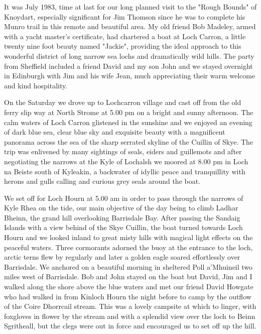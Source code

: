 \documentclass[a5paper,openany,font 10pt]{scrbook}
\begin{document}
It was July 1983, time at last for our long planned visit to
the "Rough Bounds" of Knoydart, especially significant for Jim
Thomson since he was to complete his Munro trail in this remote
and beautiful area. My old friend Bob Madeley, armed with a
yacht master's certificate, had chartered a boat at Loch Carron,
a little twenty nine foot beauty named "Jackie", providing the
ideal approach to this wonderful district of long narrow sea
lochs and dramatically wild hills. The party from Sheffield
included a friend David and my son John and we stayed overnight
in Edinburgh with Jim and his wife Jean, much appreciating their
warm welcome and kind hospitality.

On the Saturday we drove up to Lochcarron village and cast
off from the old ferry slip way at North Strome at 5.00 pm on a
bright and sunny afternoon. The calm waters of Loch Carron
glistened in the sunshine and we enjoyed an evening of dark blue
sea, clear blue sky and exquisite beauty with a magnificent
panorama across the sea of the sharp serrated skyline of the
Cuillin of Skye. The trip was enlivened by many sightings of
seals, eiders and guillemots and after negotiating the narrows at
the Kyle of Lochalsh we moored at 8.00 pm in Loch na Beiste south
of Kyleakin, a backwater of idyllic peace and tranquillity with
herons and gulls calling and curious grey seals around the boat.

We set off for Loch Hourn at 5.00 am in order to pass
through the narrows of Kyle Rhea on the tide, our main objective
of the day being to climb Ladhar Bheinn, the grand hill
overlooking Barrisdale Bay. After passing the Sandaig Islands
with a view behind of the Skye Cuillin, the boat turned towards
Loch Hourn and we looked inland to great misty hills with magical
light effects on the peaceful waters. Three cormorants adorned
the buoy at the entrance to the loch, arctic terns flew by
regularly and later a golden eagle soared effortlessly over
Barrisdale. We anchored on a beautiful morning in sheltered Poll
a'Mhuineil two miles west of Barrisdale. Bob and John stayed on
the boat but David, Jim and I walked along the shore above the
blue waters and met our friend David Howgate who had walked in
from Kinloch Hourn the night before to camp by the outflow of the
Coire Dhorrcail stream. This was a lovely campsite at which to
linger, with foxgloves in flower by the stream and with a
splendid view over the loch to Beinn Sgritheall, but the clegs
were out in force and encouraged us to set off up the hill.
\end{document}
